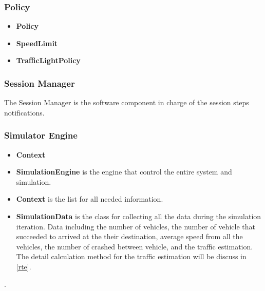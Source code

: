 \documentclass[11pt]{article}
\begin{document}
\subsubsection{Policy}        
\begin{itemize}[noitemsep]
\item \textbf{Policy} 
\item \textbf{SpeedLimit} 
\item \textbf{TrafficLightPolicy}
\end{itemize}

\subsubsection{Session Manager}
The Session Manager is the software component in charge of the session steps notifications.


\subsubsection{Simulator Engine}
        
\begin{itemize}[noitemsep]
\item \textbf{Context} 
\item \textbf{SimulationEngine} is the engine that control the entire system and simulation.
\item \textbf{Context} is the list for all needed information.
\item \textbf{SimulationData} is the class for collecting all the data during the simulation iteration. Data including the number of vehicles, the number of vehicle that succeeded to arrived at the their destination, average speed from all the vehicles, the number of crashed between vehicle, and the traffic estimation. The detail calculation method for the traffic estimation will be discuss in \ref{rte}.
\end{itemize}.
\end{document}
